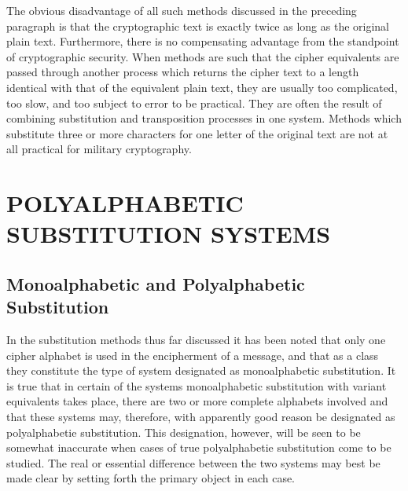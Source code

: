 The obvious disadvantage of all such methods discussed in the preceding paragraph is that the cryptographic text is exactly twice as long as
the original plain text. Furthermore, there is no compensating advantage
from the standpoint of cryptographic security. When methods are such
that the cipher equivalents are passed through another process which returns the cipher text to a length identical with that of the equivalent plain
text, they are usually too complicated, too slow, and too subject to error
to be practical. They are often the result of combining substitution and
transposition processes in one system. Methods which substitute three
or more characters for one letter of the original text are not at all practical for military cryptography.

\section{POLYALPHABETIC SUBSTITUTION SYSTEMS}

\subsection{Monoalphabetic and Polyalphabetic Substitution}

\mypara In the substitution methods thus far discussed it has been noted that
only one cipher alphabet is used in the encipherment of a message, and
that as a class they constitute the type of system designated as monoalphabetic substitution. It is true that in certain of the systems monoalphabetic substitution with variant equivalents takes place, there are two
or more complete alphabets involved and that these systems may, therefore, with apparently good reason be designated as polyalphabetie substitution. This designation, however, will be seen to be somewhat inaccurate when cases of true polyalphabetie substitution come to be studied.
The real or essential difference between the two systems may best be
made clear by setting forth the primary object in each case.

